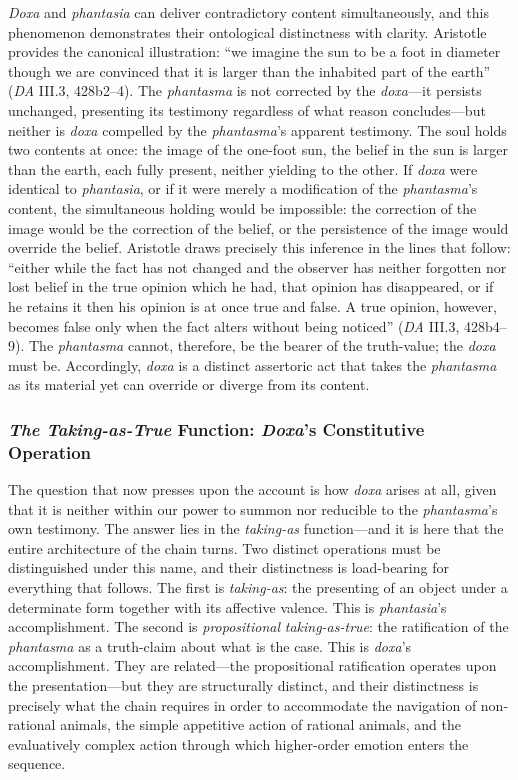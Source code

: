 \documentclass{article}
\begin{document}
\textit{Doxa} and \textit{phantasia} can deliver contradictory content simultaneously, and this phenomenon demonstrates their ontological distinctness with clarity. Aristotle provides the canonical illustration: ``we imagine the sun to be a foot in diameter though we are convinced that it is larger than the inhabited part of the earth'' (\textit{DA} III.3, 428b2--4). The \textit{phantasma} is not corrected by the \textit{doxa}---it persists unchanged, presenting its testimony regardless of what reason concludes---but neither is \textit{doxa} compelled by the \textit{phantasma}'s apparent testimony. The soul holds two contents at once: the image of the one-foot sun, the belief in the sun is larger than the earth, each fully present, neither yielding to the other. If \textit{doxa} were identical to \textit{phantasia}, or if it were merely a modification of the \textit{phantasma}'s content, the simultaneous holding would be impossible: the correction of the image would be the correction of the belief, or the persistence of the image would override the belief. Aristotle draws precisely this inference in the lines that follow: ``either while the fact has not changed and the observer has neither forgotten nor lost belief in the true opinion which he had, that opinion has disappeared, or if he retains it then his opinion is at once true and false. A true opinion, however, becomes false only when the fact alters without being noticed'' (\textit{DA} III.3, 428b4--9). The \textit{phantasma} cannot, therefore, be the bearer of the truth-value; the \textit{doxa} must be. Accordingly, \textit{doxa} is a distinct assertoric act that takes the \textit{phantasma} as its material yet can override or diverge from its content.

\subsubsection*{\textit{The Taking-as-True} Function: \textit{Doxa}'s Constitutive Operation}

The question that now presses upon the account is how \textit{doxa} arises at all, given that it is neither within our power to summon nor reducible to the \textit{phantasma}'s own testimony. The answer lies in the \textit{taking-as} function---and it is here that the entire architecture of the chain turns. Two distinct operations must be distinguished under this name, and their distinctness is load-bearing for everything that follows. The first is \textit{taking-as}: the presenting of an object under a determinate form together with its affective valence. This is \textit{phantasia}'s accomplishment. The second is \textit{propositional} \textit{taking-as-true}: the ratification of the \textit{phantasma} as a truth-claim about what is the case. This is \textit{doxa}'s accomplishment. They are related---the propositional ratification operates upon the presentation---but they are structurally distinct, and their distinctness is precisely what the chain requires in order to accommodate the navigation of non-rational animals, the simple appetitive action of rational animals, and the evaluatively complex action through which higher-order emotion enters the sequence.
\end{document}
